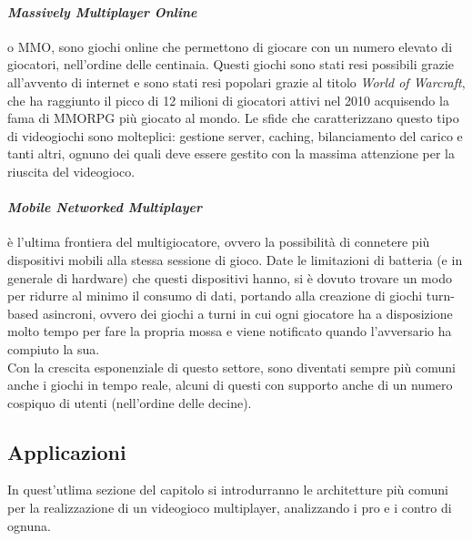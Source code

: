         \paragraph{\textit{Massively Multiplayer Online}} o MMO, sono giochi online che permettono di giocare con un numero elevato di giocatori, nell'ordine delle centinaia. Questi
            giochi sono stati resi possibili grazie all'avvento di internet e sono stati resi popolari grazie al titolo \textit{World of Warcraft}, che ha raggiunto il picco di 12 milioni di
            giocatori attivi nel 2010 acquisendo la fama di MMORPG più giocato al mondo. Le sfide che caratterizzano questo tipo di videogiochi sono molteplici: gestione server, 
            caching, bilanciamento del carico e tanti altri, ognuno dei quali deve essere gestito con la massima attenzione per la riuscita del videogioco.

        \paragraph{\textit{Mobile Networked Multiplayer}} è l'ultima frontiera del multigiocatore, ovvero la possibilità di connetere più dispositivi mobili alla stessa sessione di 
            gioco. Date le limitazioni di batteria (e in generale di hardware) che questi dispositivi hanno, si è dovuto trovare un modo per ridurre al minimo il consumo di dati,
            portando alla creazione di giochi turn-based asincroni, ovvero dei giochi a turni in cui ogni giocatore ha a disposizione molto tempo per fare la propria mossa e viene
            notificato quando l'avversario ha compiuto la sua.\\
            Con la crescita esponenziale di questo settore, sono diventati sempre più comuni anche i giochi in tempo reale, alcuni di questi con supporto anche di un numero cospiquo
            di utenti (nell'ordine delle decine).
        
    \subsection{Applicazioni}\label{subsec:MultiApplicazioni}
        In quest'utlima sezione del capitolo si introdurranno le architetture più comuni per la realizzazione di un videogioco multiplayer, analizzando i pro e i contro di ognuna.
